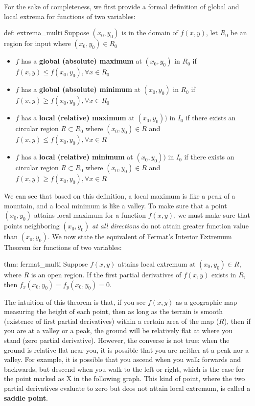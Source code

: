 For the sake of completeness, we first provide a formal definition of global and local extrema for functions of two variables: 

\smallskip

\begin{defi}{def: extrema_multi}
    Suppose $(x_0, y_0)$ is in the domain of $f(x,y)$, let $R_0$ be an region for input where $(x_0, y_0) \in R_0$
    \begin{itemize}
        \item $f$ has a \textbf{global (absolute) maximum} at $(x_0, y_0)$ in $R_0$ if $f(x,y) \le f(x_0,y_0), \forall x \in R_0$ 
        \item $f$ has a \textbf{global (absolute) minimum} at $(x_0, y_0)$ in $R_0$ if $f(x,y) \ge f(x_0,y_0), \forall x \in R_0$ 
        \item $f$ has a \textbf{local (relative) maximum} at $(x_0, y_0))$ in $I_0$ if there exists an circular region $R \subset R_0$ where $(x_0, y_0) \in R$ and $f(x,y) \le f(x_0, y_0), \forall x \in R$ 
        \item $f$ has a \textbf{local (relative) minimum} at $(x_0, y_0))$ in $I_0$ if there exists an circular region $R \subset R_0$ where $(x_0, y_0) \in R$ and $f(x,y) \ge f(x_0, y_0), \forall x \in R$ 
    \end{itemize}
\end{defi}

We can see that based on this definition, a local maximum is like a peak of a mountain, and a local minimum is like a valley.  To make sure that a point $(x_0,y_0)$ attains local maximum for a function $f(x,y)$, we must make sure that points neighboring $(x_0, y_0)$ \textit{at all directions} do not attain greater function value than $(x_0, y_0)$.  We now state the equivalent of Fermat's Interior Extremum Theorem for functions of two variables:

\begin{theo}{thm: fermat_multi}
    Suppose $f(x, y)$ attains local extremum at $(x_0, y_0) \in R$, where $R$ is an open region.  If the first partial derivatives of $f(x,y)$ exists in $R$, then $f_x(x_0, y_0) = f_y(x_0, y_0) = 0$.
\end{theo}

The intuition of this theorem is that, if you see $f(x, y)$ as a geographic map measuring the height of each point, then as long as the terrain is smooth (existence of first partial derivatives) within a certain area of the map ($R$), then if you are at a valley or a peak, the ground will be relatively flat at where you stand (zero partial derivative).  However, the converse is not true: when the ground is relative flat near you, it is possible that you are neither at a peak nor a valley.  For example, it is possible that you ascend when you walk forwards and backwards, but descend when you walk to the left or right, which is the case for the point marked as X in the following graph.  This kind of point, where the two partial derivatives evaluate to zero but deos not attain local extremum, is called a \textbf{saddle point}.


